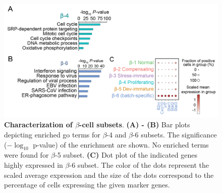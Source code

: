 \begin{figure}[H]
\centering
\vspace{150pt}
\includegraphics[width=\linewidth]{Appendix2/Fig/F3-1-v2-01.png}
\caption[Characterization of $\beta$-cell subsets]{\textbf{Characterization of $\beta$-cell subsets}. \textbf{(A) - (B)} Bar plots depicting enriched \gls{go} terms for $\beta$-4  and $\beta$-6 subsets. The significance ($-\log_{10}$ p-value) of the enrichment are shown. No enriched terms were found for $\beta$-5 subset. \textbf{(C)} Dot plot of the indicated genes highly expressed in $\beta$-6 subset. The color of the dots represent the scaled average expression and the size of the dots correspond to the percentage of cells expressing the given marker genes.}
\label{fig:app_chp3_betasubsets}
\end{figure}



